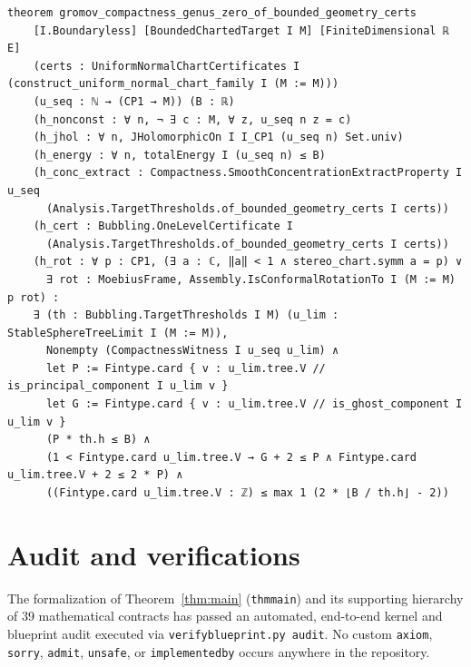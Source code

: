 \documentclass[10pt]{article}
\renewcommand{\_}{\origus\allowbreak}
\newcommand{\code}[1]{\texttt{#1}}
\begin{document}
\begin{lstlisting}[caption={Master theorem signature in \code{GromovCompactness/Main.lean} (lines 876--901).}]
theorem gromov_compactness_genus_zero_of_bounded_geometry_certs
    [I.Boundaryless] [BoundedChartedTarget I M] [FiniteDimensional ℝ E]
    (certs : UniformNormalChartCertificates I (construct_uniform_normal_chart_family I (M := M)))
    (u_seq : ℕ → (CP1 → M)) (B : ℝ)
    (h_nonconst : ∀ n, ¬ ∃ c : M, ∀ z, u_seq n z = c)
    (h_jhol : ∀ n, JHolomorphicOn I I_CP1 (u_seq n) Set.univ)
    (h_energy : ∀ n, totalEnergy I (u_seq n) ≤ B)
    (h_conc_extract : Compactness.SmoothConcentrationExtractProperty I u_seq
      (Analysis.TargetThresholds.of_bounded_geometry_certs I certs))
    (h_cert : Bubbling.OneLevelCertificate I
      (Analysis.TargetThresholds.of_bounded_geometry_certs I certs))
    (h_rot : ∀ p : CP1, (∃ a : ℂ, ‖a‖ < 1 ∧ stereo_chart.symm a = p) ∨
      ∃ rot : MoebiusFrame, Assembly.IsConformalRotationTo I (M := M) p rot) :
    ∃ (th : Bubbling.TargetThresholds I M) (u_lim : StableSphereTreeLimit I (M := M)),
      Nonempty (CompactnessWitness I u_seq u_lim) ∧
      let P := Fintype.card { v : u_lim.tree.V // is_principal_component I u_lim v }
      let G := Fintype.card { v : u_lim.tree.V // is_ghost_component I u_lim v }
      (P * th.h ≤ B) ∧
      (1 < Fintype.card u_lim.tree.V → G + 2 ≤ P ∧ Fintype.card u_lim.tree.V + 2 ≤ 2 * P) ∧
      ((Fintype.card u_lim.tree.V : ℤ) ≤ max 1 (2 * ⌊B / th.h⌋ - 2))
\end{lstlisting}


\section{Audit and verifications}

The formalization of Theorem~\ref{thm:main} (\code{thm\_main}) and its supporting hierarchy of 39
mathematical contracts has passed an automated, end-to-end kernel and blueprint audit executed via
\code{verify\_blueprint.py audit}. No custom \code{axiom}, \code{sorry}, \code{admit}, \code{unsafe},
or \code{implemented\_by} occurs anywhere in the repository.
\end{document}

